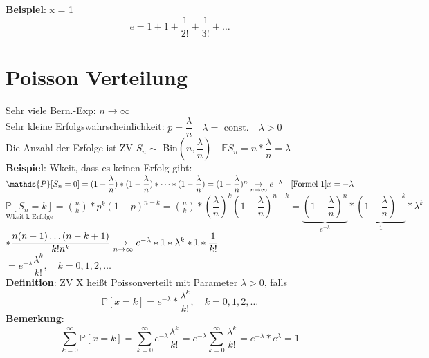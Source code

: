 \textbf{Beispiel}: x = 1
$$e = 1+1+\dfrac{1}{2!}+\dfrac{1}{3!}+\dots$$
\section{Poisson Verteilung}
Sehr viele Bern.-Exp: $n\rightarrow \infty$\\
Sehr kleine Erfolgswahrscheinlichkeit: $p=\dfrac{\lambda}{n} \quad \lambda =\text{ const.}\quad \lambda >0$\smallskip\\
Die Anzahl der Erfolge ist ZV $S_n \sim$ Bin$(n,\dfrac{\lambda}{n}) \quad \mathds{E}S_n = n*\dfrac{\lambda}{n}=\lambda$\medskip\\
\textbf{Beispiel}: Wkeit, dass es keinen Erfolg gibt: $\mathds{P}[S_n = 0] = (1-\dfrac{\lambda}{n})*(1-\dfrac{\lambda}{n})*\dots*(1-\dfrac{\lambda}{n}) = (1-\dfrac{\lambda}{n})^n \ntoinf e^{-\lambda} \quad [\text{Formel 1}] x = -\lambda$\medskip\\
$\underset{\text{Wkeit k Erfolge}}{\mathds{P}[S_n=k]} = \binom{n}{k}*p^k(1-p)^{n-k} = \binom{n}{k}*(\dfrac{\lambda}{n})^k(1-\dfrac{\lambda}{n})^{n-k} = \underbrace{(1-\dfrac{\lambda}{n})^n}_{e^{-\lambda}}*\underbrace{(1-\dfrac{\lambda}{n})^{-k}}_1 *\lambda^k$\medskip\\
$*\dfrac{n(n-1)\dots(n-k+1)}{k!n^k}\underset{n\rightarrow\infty}{\rightarrow} e^{-\lambda}*1*\lambda^k*1*\dfrac{1}{k!}$\smallskip\\
$=e^{-\lambda}\dfrac{\lambda^k}{k!}, \quad k = 0,1,2,\dots$\medskip\\
\textbf{Definition}: ZV X heißt Poissonverteilt mit Parameter $\lambda >0$, falls 
$$\mathds{P}[x=k]=e^{-\lambda}*\dfrac{\lambda^k}{k!}, \quad k=0,1,2,\dots$$
\textbf{Bemerkung}:
$$\sum_{k=0}^\infty \mathds{P}[x=k]=\sum_{k=0}^\infty e^{-\lambda}\dfrac{\lambda^k}{k!}=e^{-\lambda} \sum_{k=0}^\infty \dfrac{\lambda^k}{k!}=e^{-\lambda}*e^\lambda = 1$$
